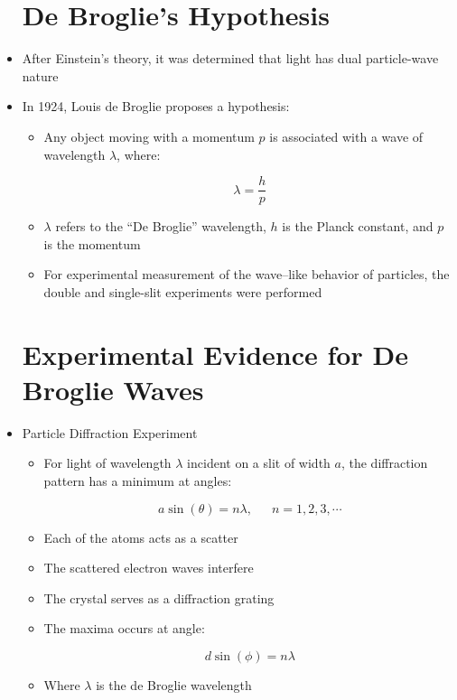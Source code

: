 \begin{itemize}

    \section{De Broglie's Hypothesis}

  \item After Einstein's theory, it was determined that light has dual particle-wave nature

  \item In 1924, Louis de Broglie proposes a hypothesis:

    \begin{itemize}

      \item Any object moving with a momentum $p$ is associated with a wave of wavelength $\lambda$, where:

        $$\boxed{\lambda=\frac{h}{p}}$$

      \item $\lambda$ refers to the ``De Broglie'' wavelength, $h$ is the Planck constant, and $p$ is the momentum

      \item For experimental measurement of the wave--like behavior of particles, the double and single-slit experiments were performed

    \end{itemize}

    \section{Experimental Evidence for De Broglie Waves}

  \item Particle Diffraction Experiment

    \begin{itemize}

      \item For light of wavelength $\lambda$ incident on a slit of width $a$, the diffraction pattern has a minimum at angles:

        $$\boxed{a\sin(\theta)=n\lambda,\,\,\,\,\,\,\,\,\, n=1,2,3,\cdots}$$

      \item Each of the atoms acts as a scatter

      \item The scattered electron waves interfere

      \item The crystal serves as a diffraction grating

      \item The maxima occurs at angle:

        $$\boxed{d\sin(\phi)=n\lambda}$$

      \item Where $\lambda$ is the de Broglie wavelength

    \end{itemize}

\end{itemize}



